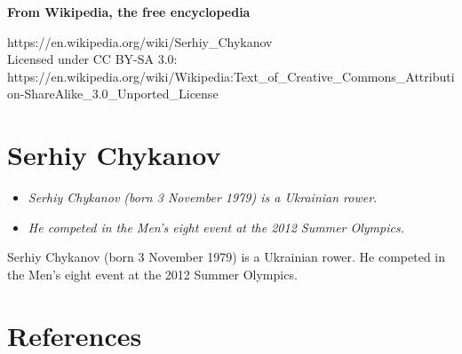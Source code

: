 \textbf{From Wikipedia, the free encyclopedia}

https://en.wikipedia.org/wiki/Serhiy\_Chykanov\\
Licensed under CC BY-SA 3.0:\\
https://en.wikipedia.org/wiki/Wikipedia:Text\_of\_Creative\_Commons\_Attribution-ShareAlike\_3.0\_Unported\_License

\section{Serhiy Chykanov}\label{serhiy-chykanov}

\begin{itemize}
\item
  \emph{Serhiy Chykanov (born 3 November 1979) is a Ukrainian rower.}
\item
  \emph{He competed in the Men's eight event at the 2012 Summer
  Olympics.}
\end{itemize}

Serhiy Chykanov (born 3 November 1979) is a Ukrainian rower. He competed
in the Men's eight event at the 2012 Summer Olympics.

\section{References}\label{references}
